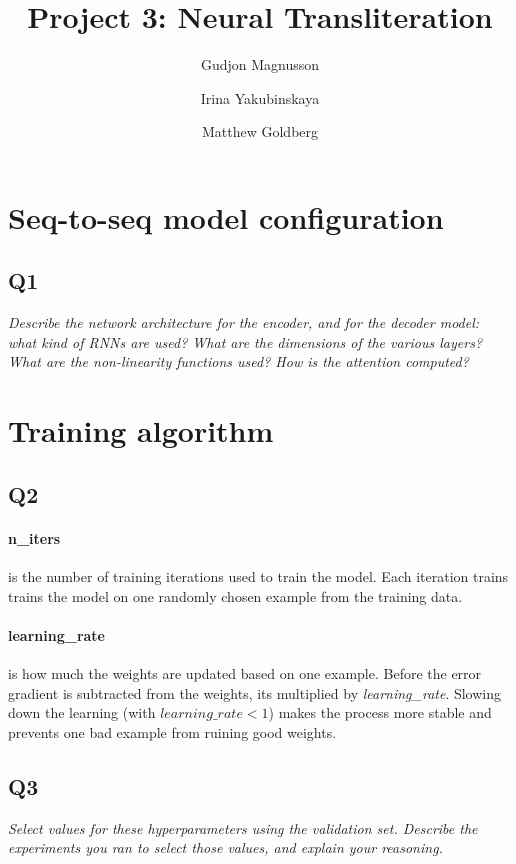 \documentclass[12pt]{article}
\begin{document}
\title{
	Project 3: Neural Transliteration
}
\author{
Gudjon Magnusson 
\and Irina Yakubinskaya 
\and Matthew Goldberg
}

\maketitle


\section{Seq-to-seq model configuration}

\subsection{Q1}
\textit{
Describe the network architecture for the encoder, and for the decoder model: what kind of RNNs are used? What are the dimensions of the various layers? What are the non-linearity functions used? How is the attention computed?
}


\section{Training algorithm}

\subsection{Q2}

\paragraph{n\_iters} is the number of training iterations used to train the model. Each iteration trains trains the model on one randomly chosen example from the training data.

\paragraph{learning\_rate} is how much the weights are updated based on one example. Before the error gradient is subtracted from the weights, its multiplied by \textit{learning\_rate}. Slowing down the learning (with $learning\_rate < 1$) makes the process more stable and prevents one bad example from ruining good weights.


\subsection{Q3}
\textit{
Select values for these hyperparameters using the validation set. Describe the experiments you ran to select those values, and explain your reasoning. 
}
\end{document}
